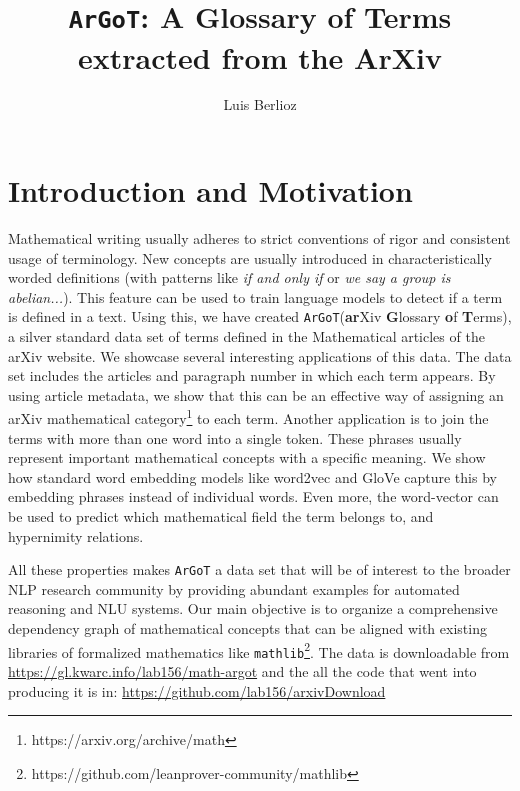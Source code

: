 \documentclass[submission,copyright,creativecommons]{eptcs}
\title{\texttt{ArGoT}: A Glossary of Terms extracted from the ArXiv}
\author{Luis Berlioz
    \institute{University of Pittsburgh\\
    Pennsylvania, USA}
\email{lab232@pitt.edu}
}
\newcommand{\argot}{\texttt{ArGoT}\xspace}
\begin{document}
\maketitle

\begin{abstract}
    
\end{abstract}

\section{Introduction and Motivation}
Mathematical writing usually adheres to strict conventions of rigor
and consistent usage of terminology.
New concepts are usually introduced in characteristically worded 
definitions (with patterns like \textit{if
    and only if} or \textit{we say a group is abelian...}). 
This feature can be used to train language models to detect if a term is defined in a text.
Using this, we have created \argot (\textbf{ar}Xiv \textbf{G}lossary \textbf{o}f \textbf{T}erms), a silver standard data set of terms defined in
the Mathematical articles of the arXiv website. 
We showcase several interesting applications of this data. The data set includes the articles and  paragraph number in which each term appears. By using article metadata, we show that this can be an effective way of assigning an arXiv mathematical category\footnote{https://arxiv.org/archive/math} to each term.
Another application is to join the terms with more than one word into a single token.
These phrases usually represent important mathematical concepts with a specific meaning.
We show how standard word embedding models like word2vec
\cite{word2vec} and GloVe \cite{pennington2014glove} capture this by embedding phrases instead of individual words.
Even more, the word-vector can be used to predict which mathematical field the term belongs to, and hypernimity relations.

All these properties  makes \argot  a data set that will be of
interest to the broader NLP research community by providing abundant
examples for automated reasoning and NLU systems. 
Our main objective is to organize a comprehensive dependency graph of mathematical concepts that can be aligned with existing libraries of formalized mathematics like \texttt{mathlib}\footnote{https://github.com/leanprover-community/mathlib}.
The data is downloadable from \url{https://gl.kwarc.info/lab156/math-argot} and the all the code that went
into producing it is in: \url{https://github.com/lab156/arxivDownload}
\end{document}
